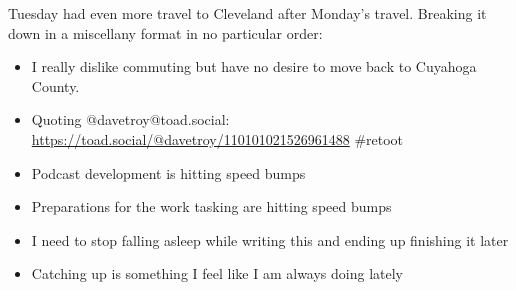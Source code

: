 Tuesday had even more travel to Cleveland after Monday's travel.
Breaking it down in a miscellany format in no particular order:

\begin{itemize}
\tightlist
\item
  I really dislike commuting but have no desire to move back to Cuyahoga
  County.
\item
  Quoting @davetroy@toad.social:
  \url{https://toad.social/@davetroy/110101021526961488} \#retoot
\item
  Podcast development is hitting speed bumps
\item
  Preparations for the work tasking are hitting speed bumps
\item
  I need to stop falling asleep while writing this and ending up
  finishing it later
\item
  Catching up is something I feel like I am always doing lately
\end{itemize}
